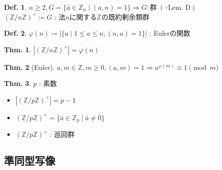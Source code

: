 \documentclass[uplatex,dvipdfmx,9pt]{beamer}
\newcommand{\sscount}{\textsection \thesubsection}
\newcounter{textExmCount}
\theoremstyle{definition} %
\newtheorem{defn}{Def.}[subsection] %
\newtheorem{thm}{Thm.}[subsection] %
\theoremstyle{example}
\begin{document}
    \begin{frame}
 
      \begin{defn}
        $n \ge 2, G = \{\bar{a} \in \mathbb{Z}_n \mid (a, n) = 1\} \Rightarrow G : \text{群} \; (\because \text{Lem. D})$ \\
        $(\mathbb{Z} / n\mathbb{Z})^\times \coloneqq G$ : 法$n$に関する$\mathbb{Z}$の\alert{既約剰余類群}
      \end{defn}

      \begin{defn}
        $\varphi(n) \coloneqq |\{a \mid 1 \le a \le n, (n, a) = 1\}|$ : \alert{Eulerの関数}
      \end{defn}

      \begin{thm}
        $|(\mathbb{Z} / n\mathbb{Z})^\times| = \varphi(n)$
      \end{thm}

      \begin{thm}[Euler]
        $a, m \in \mathbb{Z}, m \ge 0, (a, m) = 1 \Rightarrow a^{\varphi(m)} \equiv 1 \pmod{m}$
      \end{thm}

    \end{frame}

    \begin{frame}
 
      \begin{thm}
        $p$ : 素数
        \begin{itemize}
          \item $|(\mathbb{Z} / p\mathbb{Z})^\times| = p - 1$
          \item $(\mathbb{Z} / p\mathbb{Z})^\times = \{\bar{a} \in \mathbb{Z}_p \mid \bar{a} \neq \bar{0}\}$
          \item $(\mathbb{Z} / p\mathbb{Z})^\times$ : 巡回群
        \end{itemize}
      \end{thm}
      
    \end{frame}

    \subsection{\sscount 準同型写像}
    \setcounter{textExmCount}{0}
\end{document}
